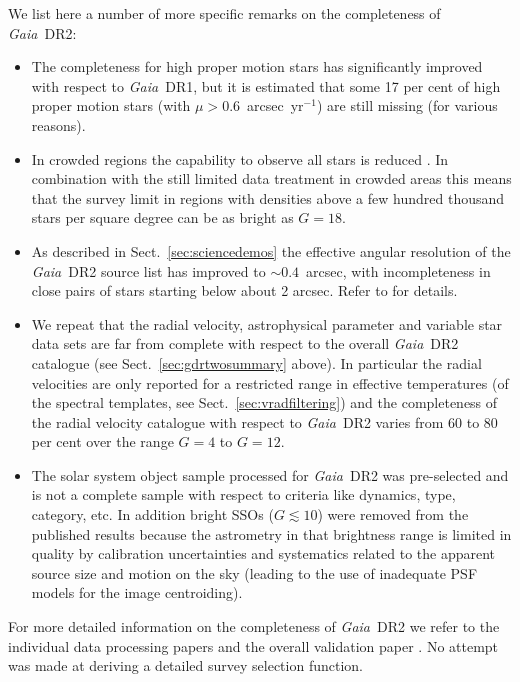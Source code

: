 \documentclass[longauth]{aa_gaia} %
\newcommand\gaia{\textit{Gaia}}
\newcommand\gdr[1]{\gaia~DR#1}
\newcommand\secref[1]{Sect.~\ref{#1}}
\begin{document}
We list here a number of more specific remarks on the completeness of \gdr{2}:
\begin{itemize}
  \item The completeness for high proper motion stars has significantly improved with respect to
    \gdr{1}, but it is estimated that some 17 per cent of high proper motion stars (with
    $\mu>0.6$~arcsec~yr$^{-1}$) are still missing (for various reasons).
  \item In crowded regions the capability to observe all stars is reduced
    \citep{2016A&A...595A...1G}. In combination with the still limited data treatment in crowded
    areas \citep[see section 6.2 in][]{2016A&A...595A...2G} this means that the survey limit in
    regions with densities above a few hundred thousand stars per square degree can be as bright as
    $G=18$.
  \item As described in \secref{sec:sciencedemos} the effective angular resolution of the \gdr{2}
    source list has improved to $\sim0.4$~arcsec, with incompleteness in close pairs of stars
    starting below about 2 arcsec.  Refer to \cite{DR2-DPACP-39} for details.
  \item We repeat that the radial velocity, astrophysical parameter and variable star data sets are
    far from complete with respect to the overall \gdr{2} catalogue (see
    \secref{sec:gdrtwosummary} above). In particular the radial velocities are only reported for a
    restricted range in effective temperatures (of the spectral templates, see
    \secref{sec:vradfiltering}) and the completeness of the radial velocity catalogue with
    respect to \gdr{2} varies from 60 to 80 per cent \citep{DR2-DPACP-54} over the range $G=4$ to
    $G=12$.
  \item The solar system object sample processed for \gdr{2} was pre-selected and is not a
    complete sample with respect to criteria like dynamics, type, category, etc. In addition bright
    SSOs ($G\lesssim10$) were removed from the published results because the astrometry in that
    brightness range is limited in quality by calibration uncertainties and systematics related to
    the apparent source size and motion on the sky (leading to the use of inadequate PSF models for
    the image centroiding).
\end{itemize}
For more detailed information on the completeness of \gdr{2} we refer to the individual data
processing papers and the overall validation paper \citep{DR2-DPACP-39}. No attempt was made at deriving
a detailed survey selection function.
\end{document}

